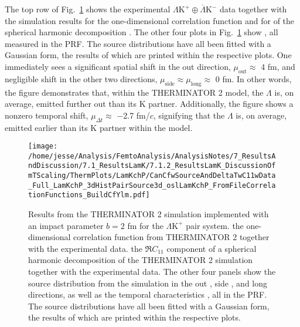 \documentclass[ALICE,manyauthors]{cernphprep}
\newcommand{\Lam}{$\Lambda$\xspace}
\newcommand{\LamKchP}{$\Lambda\mathrm{K^{+}}$\xspace}
\begin{document}
The top row of Fig.~\ref{fig:LamKchP_StdThermSources} shows the experimental $\Lambda\mathrm{K}^{+}\oplus\overline{\Lambda}\mathrm{K}^{-}$ data together with the simulation results {\color{blue}{(a)}} for the one-dimensional correlation function {\color{red}{(top left)}} and {\color{blue}{(b)}} for {} {} of the spherical harmonic decomposition {\color{red}{(top right)}}.
The other four plots in Fig.~\ref{fig:LamKchP_StdThermSources} show {\color{red}{the source distribution from the simulation in the out (middle left), side (middle right), and long (bottom left) directions, as well as the temporal characteristics of the source (bottom right)}} {}, all measured in the PRF.
The source distributions have all been fitted with a Gaussian form, the results of which are printed within the respective plots.
One immediately sees a significant spatial shift in the out direction, $\mu_{\mathrm{out}} \approx$ 4 fm, and negligible shift in the other two directions, $\mu_{\mathrm{side}} \approx \mu_{\mathrm{long}} \approx$ 0 fm.
In other words, the figure demonstrates that, within the THERMINATOR 2 model, the \Lam is, on average, emitted further out than its K partner.
Additionally, the figure shows a nonzero temporal shift, $\mu_{\Delta t} \approx$ $-$2.7 fm/$c$, signifying that the \Lam is, on average, emitted earlier than its K partner within the model. 


\begin{figure}[h!]
  \centering
  \texttt{[image: /home/jesse/Analysis/FemtoAnalysis/AnalysisNotes/7\_ResultsAndDiscussion/7.1\_ResultsLamK/7.1.2\_ResultsLamK\_DiscussionOfmTScaling/ThermPlots/LamKchP/CanCfwSourceAndDeltaTwC11wData\_Full\_LamKchP\_3dHistPairSource3d\_oslLamKchP\_FromFileCorrelationFunctions\_BuildCfYlm.pdf]}
  \caption[THERMINATOR 2 simulatin for \LamKchP]
  {
  Results from the THERMINATOR 2 simulation implemented with an impact parameter $b = 2$ fm for the \LamKchP pair system.
  {\color{red}{(Top left)}} {\color{blue}{(a)}} the one-dimensional correlation function from THERMINATOR 2 together with the experimental data.
  {\color{red}{(Top right)}} {\color{blue}{(b)}} the $\Re C_{11}$ component of a spherical harmonic decomposition of the THERMINATOR 2 simulation together with the experimental data.
  The other four panels show the source distribution from the simulation in the {\color{blue}{(c)}} out {\color{red}{(middle left)}}, {\color{blue}{(d)}} side {\color{red}{(middle right)}}, and {\color{blue}{(e)}} long {\color{red}{(bottom left)}} directions, as well as {\color{blue}{(f)}} the temporal characteristics {\color{red}{(bottom right)}}, all in the PRF.
  The source distributions have all been fitted with a Gaussian form, the results of which are printed within the respective plots.
  }
  \label{fig:LamKchP_StdThermSources}
\end{figure}
\end{document}
